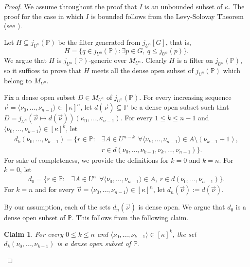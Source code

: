 \documentclass{article}
\theoremstyle{definition}
\theoremstyle{plain}
\newtheorem{claim}[definition]{Claim}
\newcommand{\po}{\mathbb{P}}
\newcommand{\la}{\langle}
\newcommand{\ra}{\rangle}
\begin{document}
    \begin{proof}
        We assume throughout the proof that $I$ is an unbounded subset of $\kappa$. The proof for the case in which $I$ is bounded follows from the Levy-Solovay Theorem (see \cite{levysolovay1967}).
        
        Let $H\subseteq j_{U^n}(\po)$ be the filter generated from $j_{U^n}[G]$, that is,
        $$ H =  \{ q\in j_{U^n}(\po)  \colon \exists p\in G, \  q\leq j_{U^n}(p) \}.$$
        We argue that $H$ is $j_{U^n}(\po)$-generic over $M_{U^n}$. Clearly $H$ is a filter on $j_{U^n}(\po)$, so it suffices to prove that $H$ meets all the dense open subset of $j_{U^n}(\po)$ which belong to $M_{U^n}$.

        Fix a dense open subset $D\in M_{U^n}$ of $j_{U^n}(\po)$. For every increasing sequence $\vec{\nu} = \la \nu_0,\ldots, \nu_{n-1} \ra\in [\kappa]^n$, let $d(\vec{\nu})\subseteq \po$ be a dense open subset such that $D = j_{U^n}(\vec{\nu}\mapsto d(\vec{\nu}))(\kappa_0,\ldots, \kappa_{n-1})$. For every $1\leq k\leq n-1$ and $\la \nu_0,\ldots, \nu_{k-1} \ra\in [\kappa]^{k}$, let 
        \begin{align*}
            d_k(\nu_0,\ldots, \nu_{k-1}) = \{r\in \po  \colon & \exists A\in U^{n-k} \ \  \forall \la \nu_k,\ldots, \nu_{n-1} \ra\in A\setminus (\nu_{k-1}+1), \\
            & r\in d(\nu_0,\ldots, \nu_{k-1}, \nu_k, \ldots, \nu_{n-1} )  \}.
        \end{align*}
        For sake of completeness, we provide the definitions for $k=0$ and $k=n$. For $k=0$, let
        \begin{align*}
            d_0 = \{r\in \po  \colon & \exists A\in U^{n} \ \  \forall \la \nu_0,\ldots, \nu_{n-1} \ra\in A, \ r\in d(\nu_0,\ldots, \nu_{n-1} )  \}.
        \end{align*}
        For $k=n$ and for every $\vec{\nu} = \la \nu_0,\ldots, \nu_{n-1} \ra\in [\kappa]^n$, let $d_{n}(\vec{\nu}) := d(\vec{\nu})$.     
        
        By our assumption, each of the sets $d_n(\vec{\nu})$ is dense open. We argue that $d_0$ is a dense open subset of $\po$. This follows from the following claim.
        
    \begin{claim}\label{Claim:DownwardsInductionMultivarFusion}
        For every $0\leq k\leq n$ and $\la \nu_0,\ldots, \nu_{k-1} \ra\in [\kappa]^{k}$, the set $d_k(\nu_0,\ldots, \nu_{k-1})$ is a dense open subset of $\po$. 


\end{claim}
\end{proof}
\end{document}
